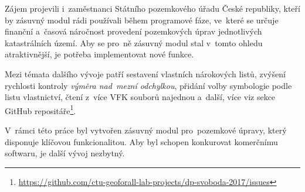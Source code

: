 Zájem projevili i~zaměstnanci Státního pozemkového úřadu České
republiky, kteří by zásuvný modul rádi používali během programové
fáze, ve~které se určuje finanční a~časová náročnost provedení
pozemkových úprav jednotlivých katastrálních území. Aby se pro~ně
zásuvný modul stal v~tomto ohledu atraktivnější, je potřeba
implementovat nové funkce.

Mezi témata dalšího vývoje patří sestavení vlastních nárokových listů,
zvýšení rychlosti kontroly \textit{výměra nad~mezní odchylkou},
přidání volby symbologie podle listu vlastnictví, čtení z~více VFK
souborů najednou a~další, více viz sekce GitHub
repositáře\footnote{\url{https://github.com/ctu-geoforall-lab-projects/dp-svoboda-2017/issues}}.

V~rámci této práce byl vytvořen zásuvný modul pro~pozemkové úpravy,
který disponuje klíčovou funkcionalitou. Aby byl schopen konkurovat
komerčnímu softwaru, je další vývoj nezbytný.
